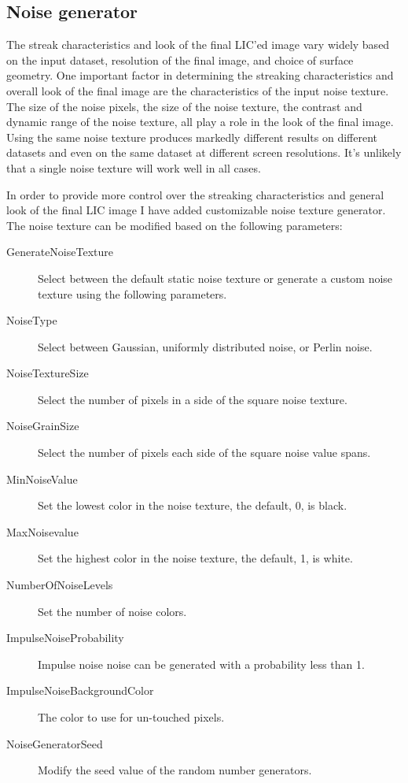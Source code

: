 \documentclass[a4paper,10pt]{article}
\begin{document}
\FloatBarrier

\subsection{Noise generator}
The streak characteristics and look of the final LIC'ed image vary widely based on the input dataset, resolution of the final image, and choice of surface geometry. One important factor in determining the streaking characteristics and overall look of the final image are the characteristics of the input noise texture. The size of the noise pixels, the size of the noise texture, the contrast and dynamic range of the noise texture, all play a role in the look of the final image. Using the same noise texture produces markedly different results on different datasets and even on the same dataset at different screen resolutions. It's unlikely that a single noise texture will work well in all cases.

In order to provide more control over the streaking characteristics and general look of the final LIC image I have added customizable noise texture generator. The noise texture can be modified based on the following parameters:

\begin{description}
\item[GenerateNoiseTexture] Select between the default static noise texture or generate a custom noise texture using the following parameters.
\item[NoiseType] Select between Gaussian, uniformly distributed noise, or Perlin noise.
\item[NoiseTextureSize] Select the number of pixels in a side of the square noise texture.
\item[NoiseGrainSize] Select the number of pixels each side of the square noise value spans.
\item[MinNoiseValue] Set the lowest color in the noise texture, the default, 0, is black.
\item[MaxNoisevalue] Set the highest color in the noise texture, the default, 1, is white.
\item[NumberOfNoiseLevels] Set the number of noise colors.
\item[ImpulseNoiseProbability] Impulse noise noise can be generated with a probability less than 1.
\item[ImpulseNoiseBackgroundColor] The color to use for un-touched pixels.
\item[NoiseGeneratorSeed] Modify the seed value of the random number generators.
\end{description}
\end{document}
